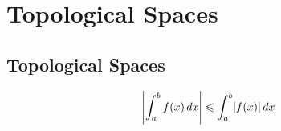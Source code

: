 \chapter{Topological Spaces}\label{ch:topological-spaces}

\section{Topological Spaces}

\[
  \abs*{\int_{a}^{b}f(x)\,dx}\leqslant\int_{a}^{b}\abs{f(x)}\,dx
\]
